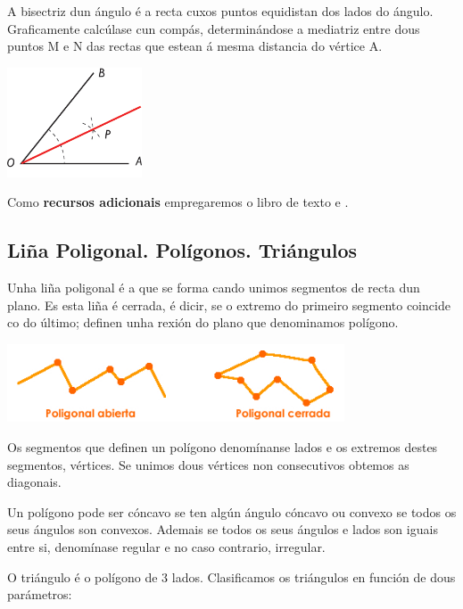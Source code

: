 A bisectriz dun ángulo é a recta cuxos puntos equidistan dos lados do ángulo. Graficamente calcúlase cun compás, determinándose a mediatriz entre dous puntos M e N das rectas que estean á mesma distancia do vértice A.

\begin{center}
    \includegraphics[width=0.3\textwidth]{img/bisectriz.png}
\end{center}

Como \textbf{recursos adicionais} empregaremos o libro de texto e \cite{yt:bisectrizmediatriz}.

\subsection{Liña Poligonal. Polígonos. Triángulos}

Unha liña poligonal é a que se forma cando unimos segmentos de recta dun plano. Es esta liña é cerrada, é dicir, se o extremo do primeiro segmento coincide co do último; definen unha rexión do plano que denominamos polígono.

\begin{center}
\includegraphics[width=0.75\textwidth]{img/lineapoligonal.jpg}
\end{center}

Os segmentos que definen un polígono denomínanse lados e os extremos destes segmentos, vértices. Se unimos dous vértices non consecutivos obtemos as diagonais.

Un polígono pode ser cóncavo se ten algún ángulo cóncavo ou convexo se todos os seus ángulos son convexos. Ademais se todos os seus ángulos e lados son iguais entre si, denomínase regular e no caso contrario, irregular.

O triángulo é o polígono de 3 lados. Clasificamos os triángulos en función de dous parámetros:

